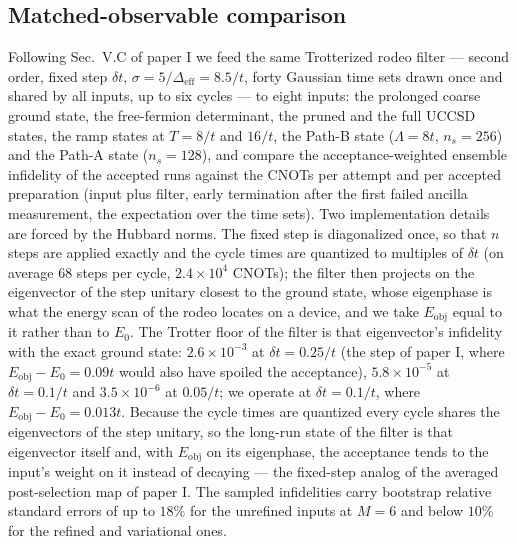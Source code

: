 \documentclass[a4paper,11pt,noarxiv]{quantumarticle}
\newcommand{\Eobj}{E_{\mathrm{obj}}}
\newcommand{\Deff}{\Delta_{\mathrm{eff}}}
\begin{document}
\subsection{Matched-observable comparison}
\label{sec:budget}
Following Sec.~V.C of paper I we feed the same Trotterized rodeo filter ---
second order, fixed step $\delta t$, $\sigma=5/\Deff=8.5/t$, forty Gaussian
time sets drawn once and shared by all inputs, up to six cycles --- to eight
inputs: the prolonged coarse ground state, the free-fermion determinant,
the pruned and the full UCCSD states, the ramp states at $T=8/t$ and $16/t$,
the Path-B state ($\Lambda=8t$, $n_s=256$) and the Path-A state ($n_s=128$),
and compare the acceptance-weighted ensemble infidelity of the accepted runs
against the CNOTs per attempt and per accepted preparation (input plus
filter, early termination after the first failed ancilla measurement, the
expectation over the time sets).  Two implementation details are forced by
the Hubbard norms.  The fixed step is diagonalized once, so that $n$ steps
are applied exactly and the cycle times are quantized to multiples of
$\delta t$ (on average $68$ steps per cycle, $2.4\times10^4$ CNOTs); the
filter then projects on the eigenvector of the step unitary closest to the
ground state, whose eigenphase is what the energy scan of the rodeo locates
on a device, and we take $\Eobj$ equal to it rather than to $E_0$.  The
Trotter floor of the filter is that eigenvector's infidelity with the exact
ground state: $2.6\times10^{-3}$ at $\delta t=0.25/t$ (the step of paper I,
where $\Eobj-E_0=0.09t$ would also have spoiled the acceptance),
$5.8\times10^{-5}$ at $\delta t=0.1/t$ and $3.5\times10^{-6}$ at $0.05/t$;
we operate at $\delta t=0.1/t$, where $\Eobj-E_0=0.013t$.  Because the cycle
times are quantized every cycle shares the eigenvectors of the step
unitary, so the long-run state of the filter is that eigenvector itself
and, with $\Eobj$ on its eigenphase, the acceptance tends to the input's
weight on it instead of decaying --- the fixed-step analog of the averaged
post-selection map of paper I.  The sampled infidelities carry bootstrap
relative standard errors of up to $18\%$ for the unrefined inputs at $M=6$
and below $10\%$ for the refined and variational ones.
\end{document}
